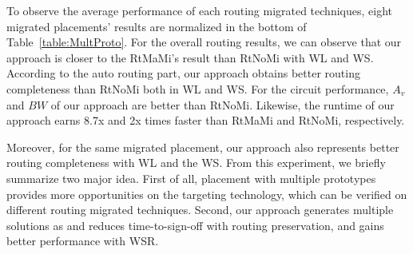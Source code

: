     To observe the average performance of each routing migrated techniques, eight migrated placements' results are normalized in the bottom of Table~\ref{table:MultProto}. For the overall routing results, we can observe that our approach is closer to the RtMaMi's result than RtNoMi with WL and WS. According to the auto routing part, our approach obtains better routing completeness than RtNoMi both in WL and WS. For the circuit performance, $A_v$ and $BW$ of our approach are better than RtNoMi. Likewise, the runtime of our approach earns 8.7x and 2x times faster than RtMaMi and RtNoMi, respectively. 

    Moreover, for the same migrated placement, our approach also represents better routing completeness with WL and the WS. From this experiment, we briefly summarize two major idea. First of all, placement with multiple prototypes provides more opportunities on the targeting technology, which can be verified on different routing migrated techniques. Second, our approach generates multiple solutions as \cite{ALP_YPWeng_iccad2011} and reduces time-to-sign-off with routing preservation, and gains better performance with WSR. 





